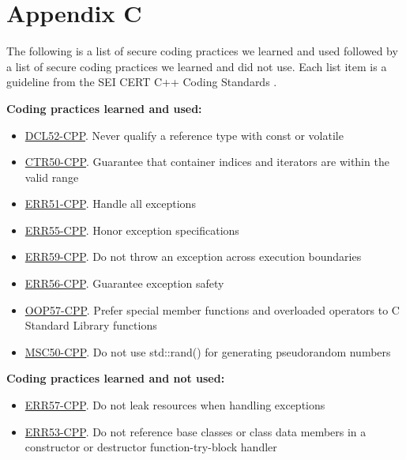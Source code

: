 \documentclass[a4paper,12pt]{article}
\begin{document}
\section{Appendix C}

The following is a list of secure coding practices we learned and used followed by a list of secure coding practices we learned and did not use. Each list item is a guideline from the SEI CERT C++ Coding Standards \cite{SEI CERT}.

\textbf{Coding practices learned and used:}
\begin{itemize}
    \item \href{https://wiki.sei.cmu.edu/confluence/x/jXw-BQ}{DCL52-CPP}. Never qualify a reference type with const or volatile
    \item \href{https://wiki.sei.cmu.edu/confluence/x/cHw-BQ}{CTR50-CPP}. Guarantee that container indices and iterators are within the valid range
    \item \href{https://wiki.sei.cmu.edu/confluence/x/H3s-BQ}{ERR51-CPP}. Handle all exceptions
    \item \href{https://wiki.sei.cmu.edu/confluence/x/J30-BQ}{ERR55-CPP}. Honor exception specifications
    \item \href{https://wiki.sei.cmu.edu/confluence/x/Rns-BQ}{ERR59-CPP}. Do not throw an exception across execution boundaries
    \item \href{https://wiki.sei.cmu.edu/confluence/x/-no-BQ}{ERR56-CPP}. Guarantee exception safety
    \item \href{https://wiki.sei.cmu.edu/confluence/x/lHs-BQ}{OOP57-CPP}. Prefer special member functions and overloaded operators to C Standard Library functions
    \item \href{https://wiki.sei.cmu.edu/confluence/x/2ns-BQ}{MSC50-CPP}. Do not use std::rand() for generating pseudorandom numbers
\end{itemize}

\textbf{Coding practices learned and not used:}
\begin{itemize}
    \item \href{https://wiki.sei.cmu.edu/confluence/x/e3s-BQ}{ERR57-CPP}. Do not leak resources when handling exceptions
    \item \href{https://wiki.sei.cmu.edu/confluence/x/_3s-BQ}{ERR53-CPP}. Do not reference base classes or class data members in a constructor or destructor function-try-block handler
\end{itemize}
\end{document}

